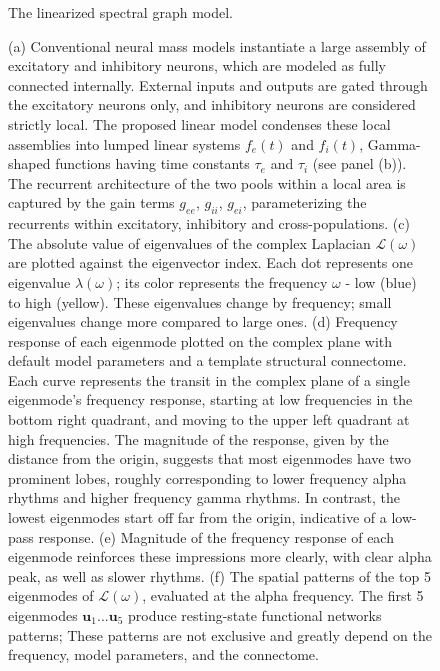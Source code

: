 \clearpage
\begin{figure}[htbp]
	\caption{The linearized spectral graph model.}
    \caption*{(a) Conventional neural mass models instantiate a large assembly of excitatory and inhibitory neurons, which are modeled as fully connected internally. External inputs and outputs are gated through the excitatory neurons only, and inhibitory neurons are considered strictly local. The proposed linear model condenses these local assemblies into lumped linear systems $f_{e}(t)$ and $f_{i}(t)$, Gamma-shaped functions having time constants $\tau_e$ and $\tau_i$ (see panel (b)). The recurrent architecture of the two pools within a local area is captured by the gain terms $g_{ee}$, $g_{ii}$, $g_{ei}$, parameterizing the recurrents within excitatory, inhibitory and cross-populations. (c) The absolute value of eigenvalues of the complex Laplacian $\bm{\mathcal{L}}(\omega)$ are plotted against the eigenvector index. Each dot represents one eigenvalue  $\lambda(\omega)$; its color represents the frequency $\omega$ - low (blue) to high (yellow). These eigenvalues change by frequency; small eigenvalues change more compared to large ones. (d) Frequency response of each eigenmode plotted on the complex plane with default model parameters and a template structural connectome. Each curve represents the transit in the complex plane of a single eigenmode's frequency response, starting at low frequencies in the bottom right quadrant, and moving to the upper left quadrant at high frequencies. The magnitude of the response, given by the distance from the origin, suggests that most eigenmodes have two prominent lobes, roughly corresponding to lower frequency alpha rhythms and higher frequency gamma rhythms. In contrast, the lowest eigenmodes start off far from the origin, indicative of a low-pass response. (e) Magnitude of the frequency response of each eigenmode reinforces these impressions more clearly, with clear alpha peak, as well as slower rhythms. (f) The spatial patterns of the top 5 eigenmodes of $\bm{\mathcal{L}}(\omega)$, evaluated at the alpha frequency. The first 5 eigenmodes $\bm{u}_1 ... \bm{u}_5$ produce resting-state functional networks patterns; These patterns are not exclusive and greatly depend on the frequency,  model parameters, and the connectome.}
    \label{fig:sgmodel}
\end{figure}
\clearpage
